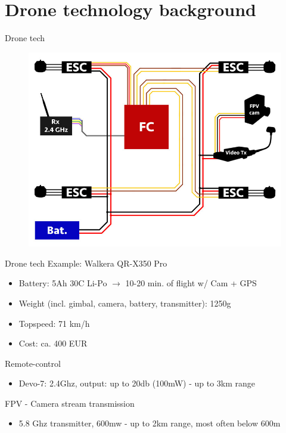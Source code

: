 \documentclass[aspectratio=169]{beamer}
\begin{document}
\section{Drone technology background}
\begin{frame}{Drone tech}
	\begin{figure}
		\includegraphics[width=0.6\linewidth]{images/06-FPV-Overview_1.jpg}
	\end{figure}
	\color{gray}{http://fpvracing.ch/img/cms/infobereich/Bauanleitung/06-FPV-Overview\_1.jpg}
\end{frame}

\begin{frame}{Drone tech}
	Example: Walkera QR-X350 Pro
	\begin{itemize}
		\item Battery: 5Ah 30C Li-Po $\rightarrow$ 10-20 min. of flight w/ Cam + GPS
		\item Weight (incl. gimbal, camera, battery, transmitter): 1250g
		\item Topspeed: 71 km/h
		\item Cost: ca. 400 EUR
	\end{itemize}
	
	Remote-control
	\begin{itemize}
		\item Devo-7: 2.4Ghz, output: up to 20db (100mW) - up to 3km range
	\end{itemize}
	
	FPV - Camera stream transmission
	\begin{itemize}
		\item 5.8 Ghz transmitter, 600mw - up to 2km range, most often below 600m
	\end{itemize}
\end{frame}
\end{document}
